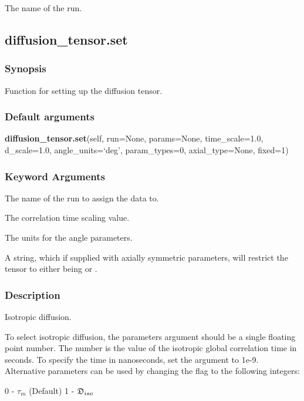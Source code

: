   The name of the run.


\newpage

\subsection{diffusion\_tensor.set}


\subsubsection{Synopsis}

Function for setting up the diffusion tensor.

\subsubsection{Default arguments}

\textsf{\textbf{diffusion\_tensor.set}(self, run=None, params=None, time\_scale=1.0, d\_scale=1.0, angle\_units=`deg', param\_types=0, axial\_type=None, fixed=1)}


\subsubsection{Keyword Arguments}

  The name of the run to assign the data to.

  The correlation time scaling value.

  The units for the angle parameters.

  A string, which if supplied with axially symmetric parameters, will restrict the tensor to either being 
 or 
.


\subsubsection{Description}

Isotropic diffusion.

To select isotropic diffusion, the parameters argument should be a single floating point
number.  The number is the value of the isotropic global correlation time in seconds.  To
specify the time in nanoseconds, set the 
 argument to 1e-9.  Alternative
parameters can be used by changing the 
 flag to the following integers:

    0 - $\tau_m$   (Default)
    1 - $\mathfrak{D}_{iso}$

